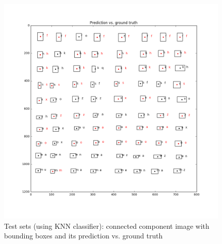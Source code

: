 \documentclass{extarticle}
\theoremstyle{definition}
\theoremstyle{definition}
\begin{document}
\begin{figure}[H]
	\includegraphics[width = 0.5\linewidth]{./figures/test2_gt_Prediction_vs_ground_truth_improve_knn.png}	
	\caption{Test sets (using KNN classifier): connected component image with bounding boxes and its prediction vs. ground truth}
	\label{figure8}
\end{figure}
\end{document}
